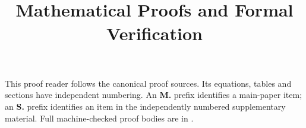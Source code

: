 \documentclass[10pt]{article}
\title{\papertitle\\[5pt]\large Mathematical Proofs and Formal Verification}
\author{}
\date{}
\begin{document}
\maketitle
\thispagestyle{fancy}
\noindent This proof reader follows the canonical proof sources. Its equations,
tables and sections have independent numbering. An \textbf{M.} prefix identifies
a main-paper item; an \textbf{S.} prefix identifies an item in the independently
numbered supplementary material. Full machine-checked proof bodies are in
.

\end{document}
